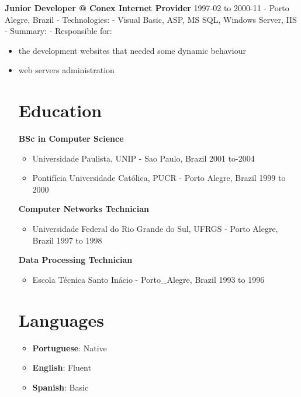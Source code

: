\documentclass[margin]{res}
\begin{document}
\textbf{Junior Developer @ Conex Internet Provider} 1997-02 to 2000-11 -
Porto Alegre, Brazil - Technologies: - Visual Basic, ASP, MS SQL,
Windows Server, IIS - Summary: - Responsible for:
 \begin{itemize}
 \item
 the development websites that needed some dynamic behaviour 
 \item
 web servers administration

\section{Education}

\textbf{BSc in Computer Science}

\begin{itemize}

\item
  Universidade Paulista, UNIP - Sao Paulo, Brazil 2001 to-2004
\item
  Pontifícia Universidade Católica, PUCR - Porto Alegre, Brazil 1999 to
  2000
\end{itemize}

\textbf{Computer Networks Technician}

\begin{itemize}

\item
  Universidade Federal do Rio Grande do Sul, UFRGS - Porto Alegre,
  Brazil 1997 to 1998
\end{itemize}

\textbf{Data Processing Technician}

\begin{itemize}

\item
  Escola Técnica Santo Inácio - Porto\_Alegre, Brazil 1993 to 1996
\end{itemize}

\section{Languages}

\begin{itemize}

\item
  \textbf{Portuguese}: Native
\item
  \textbf{English}: Fluent
\item
  \textbf{Spanish}: Basic
\end{itemize}


\end{itemize}
\end{document}

